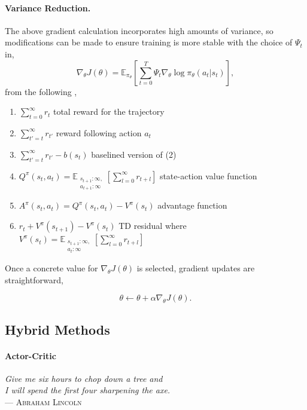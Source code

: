 \paragraph{Variance Reduction.}
The above gradient calculation incorporates high amounts of variance, so modifications can be made to ensure training is more stable with the choice of $\Psi_t$ in,
$$
\nabla_{\theta}J(\theta) = \mathbb E_{\pi_{\theta}}\left[\sum_{t=0}^T \Psi_t \nabla_{\theta}\log \pi_{\theta}(a_t|s_t)\right],
$$
from the following \cite{ADVEST2018},
\begin{enumerate}
\item $\sum_{t=0}^\infty r_{t}$ total reward for the trajectory
\item $\sum_{t'=t}^\infty r_{t'}$ reward following action $a_t$
\item $\sum_{t'=t}^\infty r_{t'} - b(s_t)$ baselined version of (2)
\item $Q^{\pi}(s_t,a_t) = \mathbb E_{\substack{s_{t+1}:\infty,\\ a_{t+1}:\infty}}\left[
\sum_{l=0}^{\infty}r_{t+l}
\right]$ state-action value function
\item $A^\pi(s_t,a_t) = Q^{\pi}(s_t,a_t) - V^{\pi}(s_t)$  advantage function
\item $r_t + V^\pi(s_{t+1}) - V^\pi(s_t)$ \ac{TD} residual where $V^{\pi}(s_t) = \mathbb E_{\substack{s_{t+1}:\infty,\\ a_{t}:\infty}}\left[
\sum_{l=0}^{\infty}r_{t+l}
\right]$
\end{enumerate}

Once a concrete value for $\nabla_{\theta}J(\theta)$ is selected, gradient updates are straightforward,

$$
\theta \leftarrow \theta + \alpha \nabla_{\theta}J(\theta).
$$

\subsection{Hybrid Methods}

\paragraph{Actor-Critic}
\begin{flushright}{\slshape    
    \textit{Give me six hours to chop down a tree and\\
    I will spend the first four sharpening the axe.}} \\ \medskip
    --- \textsc{Abraham Lincoln}
\end{flushright}

